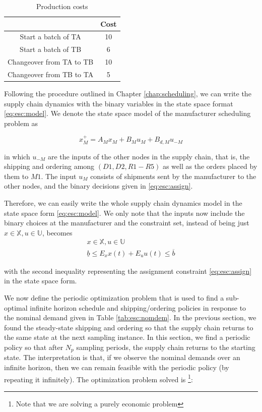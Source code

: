 \begin{table}
\caption{Production costs}
\label{tab:esc:sched_prod}
\begin{center}
\begin{tabular}{cc}\toprule
 &Cost \\ \midrule
Start a batch of TA & 10\\
Start a batch of TB & 6 \\
Changeover from TA to TB & 10\\
Changeover from TB to TA & 5\\
\bottomrule 
\end{tabular}
\end{center}
\end{table}


Following the procedure outlined in
Chapter \ref{chap:scheduling}, we can write the supply
chain dynamics with the binary variables in the state space format
\eqref{eq:esc:model}. We denote the state space model of the
manufacturer scheduling problem as

\begin{equation}
x_M^+ = A_Mx_M + B_Mu_M + B_{d,M}u_{-M}
\end{equation}

in which $u_{-M}$ are the inputs of the other nodes in the supply chain, that is, the
shipping and ordering among $(D1,D2,R1 - R5)$ as well as the orders
placed by them to $M1$. The input $u_M$ consists of shipments sent by
the manufacturer to  the other nodes, and the binary decisions given
in \eqref{eq:esc:assign}. 

Therefore, we can easily write the whole supply chain dynamics model in
the state space form \eqref{eq:esc:model}. We only note that the
inputs now include the binary choices at the manufacturer and the
constraint set, instead of being just $x \in \mathbb{X}, u \in \mathbb{U}$,
becomes
\begin{gather}
\label{eq:esc:constraints}
 x \in \mathbb{X}, u \in \mathbb{U} \\
 \underline{b} \leq E_x x(t) + E_u u(t) \leq \overline{b}
\end{gather}

with the second inequality representing the assignment constraint
\eqref{eq:esc:assign} in the state space form.


We now define the periodic optimization problem that is used to find a
sub-optimal infinite horizon schedule and shipping/ordering policies
in response to the nominal demand given in Table \ref{tab:esc:nomdem}. In
the previous section, we found the steady-state shipping and ordering
so that the supply chain returns to the same state at the next
sampling instance. In this section, we find a periodic policy 
so that after $N_{p}$ sampling periods, the supply chain returns to the starting
state. The interpretation is that, if we observe the  nominal demands over
an infinite horizon, then we can remain feasible with the periodic
policy (by repeating it infinitely).
The optimization problem solved is \footnote{Note that we are solving
  a purely economic problem}:

